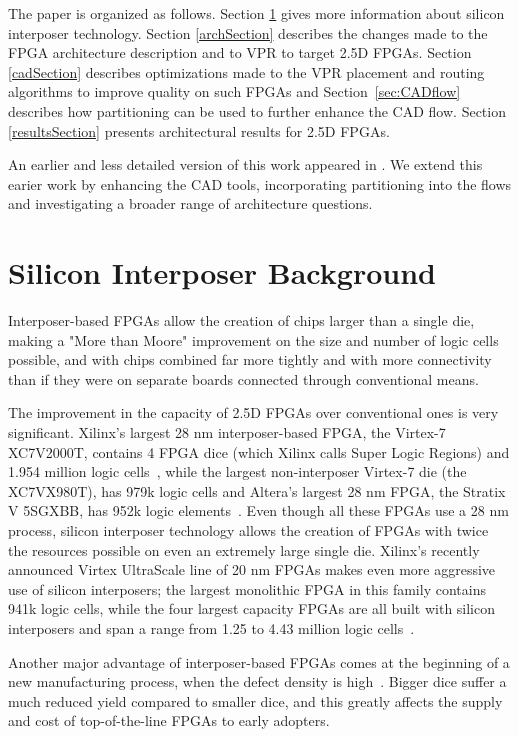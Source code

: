 \documentclass[journal]{IEEEtran}
\begin{document}
The paper is organized as follows. Section \ref{siliconSection} gives more information about silicon interposer technology. Section \ref{archSection} describes the changes made to the FPGA architecture description and to VPR to target 2.5D FPGAs. Section \ref{cadSection} describes optimizations made to the VPR placement and routing algorithms to improve quality on such FPGAs and Section~\ref{sec:CADflow} describes how partitioning can be used to further enhance the CAD flow. Section \ref{resultsSection} presents architectural results for 2.5D FPGAs.

An earlier and less detailed version of this work appeared in \cite{interposer2014}. We extend this earier work by enhancing the CAD tools, incorporating partitioning into the flows and investigating a broader range of architecture questions. 


\section{Silicon Interposer Background}
\label{siliconSection}

Interposer-based FPGAs allow the creation of chips larger than a single die, making a "More than Moore" improvement on the size and number of logic cells possible, and with chips combined far more tightly and with more connectivity than if they were on separate boards connected through conventional means.

The improvement in the capacity of 2.5D FPGAs over conventional ones is very significant. Xilinx's largest 28 nm interposer-based FPGA, the Virtex-7 XC7V2000T, contains 4 FPGA dice (which Xilinx calls Super Logic Regions) and 1.954 million logic cells~\cite{xilinx7series}, while the largest non-interposer Virtex-7 die (the XC7VX980T), has 979k logic cells and Altera's largest 28 nm FPGA, the Stratix V 5SGXBB, has 952k logic elements~\cite{stratixV}. Even though all these FPGAs use a 28 nm process, silicon interposer technology allows the creation of FPGAs with twice the resources possible on even an extremely large single die. Xilinx's recently announced Virtex UltraScale line of 20 nm FPGAs makes even more aggressive use of silicon interposers; the largest monolithic FPGA in this family contains 941k logic cells, while the four largest capacity FPGAs are all built with silicon interposers and span a range from 1.25 to 4.43 million logic cells~\cite{virtexultrascale}.

Another major advantage of interposer-based FPGAs comes at the beginning of a new manufacturing process, when the defect density is high~\cite{xilinxTSVperformance}. Bigger dice suffer a much reduced yield compared to smaller dice, and this greatly affects the supply and cost of top-of-the-line FPGAs to early adopters.
\end{document}
